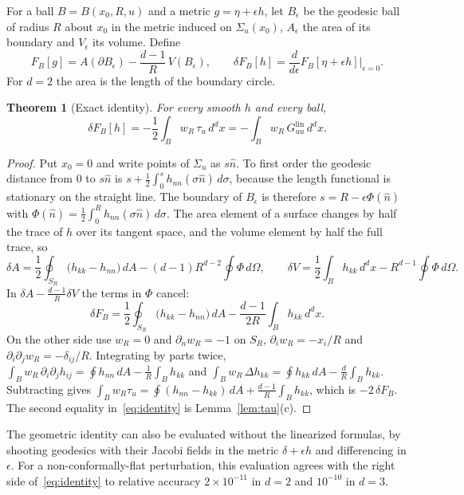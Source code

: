 \documentclass[12pt]{article}
\newtheorem{theorem}{Theorem}[section]
\theoremstyle{definition}
\theoremstyle{remark}
\newcommand{\Glin}{G^{\mathrm{lin}}}
\begin{document}
For a ball \(B=B(x_0,R,u)\) and a metric \(g=\eta+\epsilon h\), let \(B_\epsilon\) be the
geodesic ball of radius \(R\) about \(x_0\) in the metric induced on \(\Sigma_u(x_0)\),
\(A_\epsilon\) the area of its boundary and \(V_\epsilon\) its volume. Define
\begin{equation}\label{eq:F}
F_B[g]=A(\partial B_\epsilon)-\frac{d-1}{R}\,V(B_\epsilon),\qquad
\delta F_B[h]=\frac{d}{d\epsilon}F_B[\eta+\epsilon h]\Big|_{\epsilon=0}.
\end{equation}
For \(d=2\) the area is the length of the boundary circle.

\begin{theorem}[Exact identity]\label{thm:identity}
For every smooth \(h\) and every ball,
\begin{equation}\label{eq:identity}
\delta F_B[h]=-\frac12\int_B w_R\,\tau_u\,d^dx=-\int_B w_R\,\Glin_{uu}\,d^dx .
\end{equation}
\end{theorem}

\begin{proof}
Put \(x_0=0\) and write points of \(\Sigma_u\) as \(s\hat n\). To first order the geodesic
distance from \(0\) to \(s\hat n\) is \(s+\frac12\int_0^sh_{nn}(\sigma\hat n)\,d\sigma\),
because the length functional is stationary on the straight line. The boundary of
\(B_\epsilon\) is therefore \(s=R-\epsilon\Phi(\hat n)\) with
\(\Phi(\hat n)=\frac12\int_0^Rh_{nn}(\sigma\hat n)\,d\sigma\). The area element of a surface
changes by half the trace of \(h\) over its tangent space, and the volume element by half
the full trace, so
\[
\delta A=\frac12\oint_{S_R}\big(h_{kk}-h_{nn}\big)\,dA-(d-1)R^{d-2}\oint\Phi\,d\Omega,\qquad
\delta V=\frac12\int_{B}h_{kk}\,d^dx-R^{d-1}\oint\Phi\,d\Omega .
\]
In \(\delta A-\frac{d-1}{R}\delta V\) the terms in \(\Phi\) cancel:
\[
\delta F_B=\frac12\oint_{S_R}\big(h_{kk}-h_{nn}\big)\,dA-\frac{d-1}{2R}\int_Bh_{kk}\,d^dx .
\]
On the other side use \(w_R=0\) and \(\partial_nw_R=-1\) on \(S_R\),
\(\partial_iw_R=-x_i/R\) and \(\partial_i\partial_jw_R=-\delta_{ij}/R\). Integrating by parts
twice,
\(\int_Bw_R\,\partial_i\partial_jh_{ij}=\oint h_{nn}\,dA-\frac1R\int_Bh_{kk}\) and
\(\int_Bw_R\,\Delta h_{kk}=\oint h_{kk}\,dA-\frac dR\int_Bh_{kk}\). Subtracting gives
\(\int_Bw_R\tau_u=\oint(h_{nn}-h_{kk})\,dA+\frac{d-1}R\int_Bh_{kk}\), which is
\(-2\,\delta F_B\). The second equality in~\eqref{eq:identity} is
Lemma~\ref{lem:tau}(c).
\end{proof}

The geometric identity can also be evaluated without the linearized formulas, by
shooting geodesics with their
Jacobi fields in the metric \(\delta+\epsilon h\) and differencing in \(\epsilon\).
For a non-conformally-flat perturbation, this evaluation agrees with
the right side of~\eqref{eq:identity} to
relative accuracy \(2\times10^{-11}\) in \(d=2\) and \(10^{-10}\) in \(d=3\).
\end{document}
